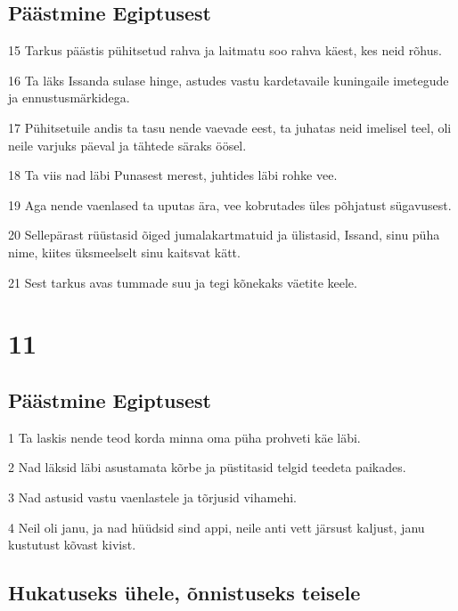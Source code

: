 \section*{Päästmine Egiptusest}

\par 15 Tarkus päästis pühitsetud rahva ja laitmatu soo rahva käest, kes neid rõhus.
\par 16 Ta läks Issanda sulase hinge, astudes vastu kardetavaile kuningaile imetegude ja ennustusmärkidega.
\par 17 Pühitsetuile andis ta tasu nende vaevade eest, ta juhatas neid imelisel teel, oli neile varjuks päeval ja tähtede säraks öösel.
\par 18 Ta viis nad läbi Punasest merest, juhtides läbi rohke vee.
\par 19 Aga nende vaenlased ta uputas ära, vee kobrutades üles põhjatust sügavusest.
\par 20 Sellepärast rüüstasid õiged jumalakartmatuid ja ülistasid, Issand, sinu püha nime, kiites üksmeelselt sinu kaitsvat kätt.
\par 21 Sest tarkus avas tummade suu ja tegi kõnekaks väetite keele. 

\chapter{11}

\section*{Päästmine Egiptusest}

\par 1 Ta laskis nende teod korda minna oma püha prohveti käe läbi.
\par 2 Nad läksid läbi asustamata kõrbe ja püstitasid telgid teedeta paikades.
\par 3 Nad astusid vastu vaenlastele ja tõrjusid vihamehi.
\par 4 Neil oli janu, ja nad hüüdsid sind appi, neile anti vett järsust kaljust, janu kustutust kõvast kivist.

\section*{Hukatuseks ühele, õnnistuseks teisele}

